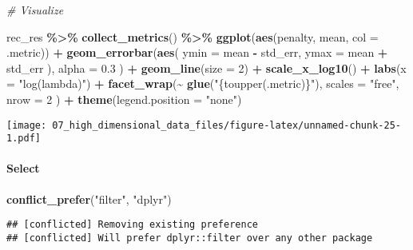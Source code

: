 \documentclass[
]{book}
\newenvironment{Shaded}{\begin{snugshade}}{\end{snugshade}}
\newcommand{\CommentTok}[1]{\textcolor[rgb]{0.56,0.35,0.01}{\textit{#1}}}
\newcommand{\DataTypeTok}[1]{\textcolor[rgb]{0.13,0.29,0.53}{#1}}
\newcommand{\DecValTok}[1]{\textcolor[rgb]{0.00,0.00,0.81}{#1}}
\newcommand{\FloatTok}[1]{\textcolor[rgb]{0.00,0.00,0.81}{#1}}
\newcommand{\KeywordTok}[1]{\textcolor[rgb]{0.13,0.29,0.53}{\textbf{#1}}}
\newcommand{\NormalTok}[1]{#1}
\newcommand{\OperatorTok}[1]{\textcolor[rgb]{0.81,0.36,0.00}{\textbf{#1}}}
\newcommand{\StringTok}[1]{\textcolor[rgb]{0.31,0.60,0.02}{#1}}
\begin{document}
\begin{Shaded}
\begin{Highlighting}[]
\CommentTok{\# Visualize}

\NormalTok{rec\_res }\OperatorTok{\%\textgreater{}\%}
\StringTok{  }\KeywordTok{collect\_metrics}\NormalTok{() }\OperatorTok{\%\textgreater{}\%}
\StringTok{  }\KeywordTok{ggplot}\NormalTok{(}\KeywordTok{aes}\NormalTok{(penalty, mean, }\DataTypeTok{col =}\NormalTok{ .metric)) }\OperatorTok{+}
\StringTok{  }\KeywordTok{geom\_errorbar}\NormalTok{(}\KeywordTok{aes}\NormalTok{(}
    \DataTypeTok{ymin =}\NormalTok{ mean }\OperatorTok{{-}}\StringTok{ }\NormalTok{std\_err,}
    \DataTypeTok{ymax =}\NormalTok{ mean }\OperatorTok{+}\StringTok{ }\NormalTok{std\_err}
\NormalTok{  ),}
  \DataTypeTok{alpha =} \FloatTok{0.3}
\NormalTok{  ) }\OperatorTok{+}
\StringTok{  }\KeywordTok{geom\_line}\NormalTok{(}\DataTypeTok{size =} \DecValTok{2}\NormalTok{) }\OperatorTok{+}
\StringTok{  }\KeywordTok{scale\_x\_log10}\NormalTok{() }\OperatorTok{+}
\StringTok{  }\KeywordTok{labs}\NormalTok{(}\DataTypeTok{x =} \StringTok{"log(lambda)"}\NormalTok{) }\OperatorTok{+}
\StringTok{  }\KeywordTok{facet\_wrap}\NormalTok{(}\OperatorTok{\textasciitilde{}}\StringTok{ }\KeywordTok{glue}\NormalTok{(}\StringTok{"\{toupper(.metric)\}"}\NormalTok{),}
    \DataTypeTok{scales =} \StringTok{"free"}\NormalTok{,}
    \DataTypeTok{nrow =} \DecValTok{2}
\NormalTok{  ) }\OperatorTok{+}
\StringTok{  }\KeywordTok{theme}\NormalTok{(}\DataTypeTok{legend.position =} \StringTok{"none"}\NormalTok{)}
\end{Highlighting}
\end{Shaded}

\texttt{[image: 07\_high\_dimensional\_data\_files/figure-latex/unnamed-chunk-25-1.pdf]}

\hypertarget{select}{%
\paragraph{Select}\label{select}}

\begin{Shaded}
\begin{Highlighting}[]
\KeywordTok{conflict\_prefer}\NormalTok{(}\StringTok{"filter"}\NormalTok{, }\StringTok{"dplyr"}\NormalTok{)}
\end{Highlighting}
\end{Shaded}

\begin{verbatim}
## [conflicted] Removing existing preference
## [conflicted] Will prefer dplyr::filter over any other package
\end{verbatim}
\end{document}
